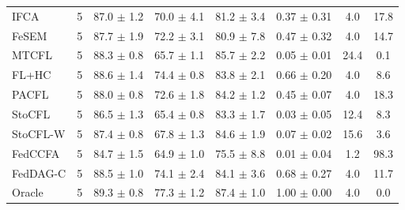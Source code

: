 {{\begin{tabular}{l r c c c c c c}
IFCA & 5 & 87.0 $\pm$ 1.2 & 70.0 $\pm$ 4.1 & 81.2 $\pm$ 3.4 & 0.37 $\pm$ 0.31 & 4.0 & 17.8 \\
FeSEM & 5 & 87.7 $\pm$ 1.9 & 72.2 $\pm$ 3.1 & 80.9 $\pm$ 7.8 & 0.47 $\pm$ 0.32 & 4.0 & 14.7 \\
MTCFL & 5 & 88.3 $\pm$ 0.8 & 65.7 $\pm$ 1.1 & 85.7 $\pm$ 2.2 & 0.05 $\pm$ 0.01 & 24.4 & 0.1 \\
FL+HC & 5 & 88.6 $\pm$ 1.4 & 74.4 $\pm$ 0.8 & 83.8 $\pm$ 2.1 & 0.66 $\pm$ 0.20 & 4.0 & 8.6 \\
PACFL & 5 & 88.0 $\pm$ 0.8 & 72.6 $\pm$ 1.8 & 84.2 $\pm$ 1.2 & 0.45 $\pm$ 0.07 & 4.0 & 18.3 \\
StoCFL & 5 & 86.5 $\pm$ 1.3 & 65.4 $\pm$ 0.8 & 83.3 $\pm$ 1.7 & 0.03 $\pm$ 0.05 & 12.4 & 8.3 \\
StoCFL-W & 5 & 87.4 $\pm$ 0.8 & 67.8 $\pm$ 1.3 & 84.6 $\pm$ 1.9 & 0.07 $\pm$ 0.02 & 15.6 & 3.6 \\
FedCCFA & 5 & 84.7 $\pm$ 1.5 & 64.9 $\pm$ 1.0 & 75.5 $\pm$ 8.8 & 0.01 $\pm$ 0.04 & 1.2 & 98.3 \\
FedDAG-C & 5 & 88.5 $\pm$ 1.0 & 74.1 $\pm$ 2.4 & 84.1 $\pm$ 3.6 & 0.68 $\pm$ 0.27 & 4.0 & 11.7 \\
Oracle & 5 & 89.3 $\pm$ 0.8 & 77.3 $\pm$ 1.2 & 87.4 $\pm$ 1.0 & 1.00 $\pm$ 0.00 & 4.0 & 0.0 \\
\bottomrule
\end{tabular}}
}

